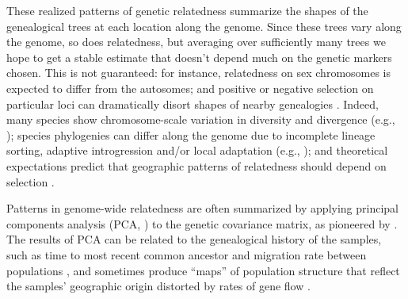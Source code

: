 \documentclass[11pt, oneside]{article}   	%
\begin{document}
These realized patterns of genetic relatedness
summarize the shapes of the genealogical trees %
at each location along the genome.
Since these trees vary along the genome, so does relatedness,
but averaging over sufficiently many trees we hope to get a stable estimate
that doesn't depend much on the genetic markers chosen.
This is not guaranteed:
for instance,
relatedness on sex chromosomes is expected to differ from the autosomes;
and positive or negative selection on particular loci can dramatically disort shapes of nearby genealogies
\citep{kim2002hitchhiking,charlesworth1993effect,barton2000genetic}.
Indeed,
many species show chromosome-scale variation in diversity and divergence
(e.g., \citep{langley2012genomic});
species phylogenies can differ along the genome 
due to incomplete lineage sorting,
adaptive introgression and/or local adaptation 
(e.g., \citep{pease2013accurate,ellegren2012genomic,nadeau2012genomic,pool2015natural,vernot2014resurrecting});
and theoretical expectations predict that geographic patterns of relatedness should depend on selection
\citep{charlesworth2003review}.

Patterns in genome-wide relatedness are often summarized
by applying principal components analysis (PCA, \citep{patterson2006population}) 
to the genetic covariance matrix,
as pioneered by \citet{menozzi1978synthetic}.
The results of PCA can be related to the genealogical history of the samples, 
such as time to most recent common ancestor and migration rate between populations \citep{novembre2008interpreting,mcvean2009genealogical}, 
and sometimes produce ``maps'' of population structure
that reflect the samples' geographic origin distorted by rates of gene flow
\citep{novembre2008genes}.
\end{document}
